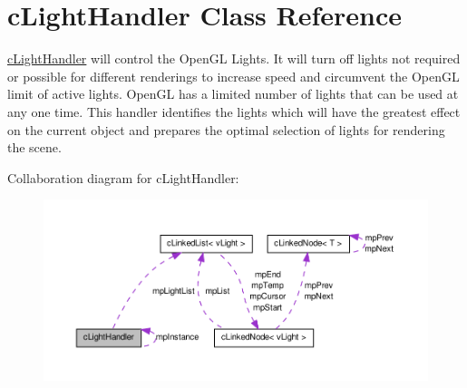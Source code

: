 \hypertarget{classc_light_handler}{
\section{cLightHandler Class Reference}
\label{classc_light_handler}
}


\hyperlink{classc_light_handler}{cLightHandler} will control the OpenGL Lights. It will turn off lights not required or possible for different renderings to increase speed and circumvent the OpenGL limit of active lights. OpenGL has a limited number of lights that can be used at any one time. This handler identifies the lights which will have the greatest effect on the current object and prepares the optimal selection of lights for rendering the scene.  




Collaboration diagram for cLightHandler:\nopagebreak
\begin{figure}[H]
\begin{center}
\leavevmode
\includegraphics[width=400pt]{classc_light_handler__coll__graph}
\end{center}
\end{figure}
